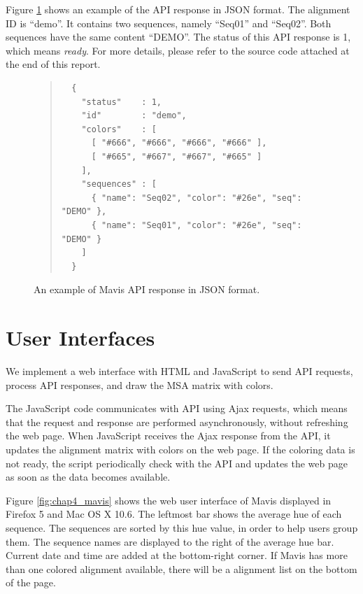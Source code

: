 Figure \ref{fig:api-res} shows an example of the API response in JSON format. The alignment ID is ``demo''. It contains two sequences, namely ``Seq01'' and ``Seq02''. Both sequences have the same content ``DEMO''. The status of this API response is 1, which means \emph{ready}. For more details, please refer to the source code attached at the end of this report.

\begin{figure}[hbt]
\begin{quote}
\begin{verbatim}
  {
    "status"    : 1,
    "id"        : "demo",
    "colors"    : [
      [ "#666", "#666", "#666", "#666" ],
      [ "#665", "#667", "#667", "#665" ]
    ],
    "sequences" : [
      { "name": "Seq02", "color": "#26e", "seq": "DEMO" },
      { "name": "Seq01", "color": "#26e", "seq": "DEMO" }
    ]
  }
\end{verbatim}
\end{quote}
\caption[Example of API Response in JSON Format]{An example of Mavis API response in JSON format.}\label{fig:api-res}
\end{figure}

\section{User Interfaces}

We implement a web interface with HTML and JavaScript to send API requests, process API responses, and draw the MSA matrix with colors.

The JavaScript code communicates with API using Ajax requests, which means that the request and response are performed asynchronously, without refreshing the web page. When JavaScript receives the Ajax response from the API, it updates the alignment matrix with colors on the web page. If the coloring data is not ready, the script periodically check with the API and updates the web page as soon as the data becomes available.

Figure \ref{fig:chap4_mavis} shows the web user interface of Mavis displayed in Firefox 5 and Mac OS X 10.6. The leftmost bar shows the average hue of each sequence. The sequences are sorted by this hue value, in order to help users group them. The sequence names are displayed to the right of the average hue bar. Current date and time are added at the bottom-right corner. If Mavis has more than one colored alignment available, there will be a alignment list on the bottom of the page.

